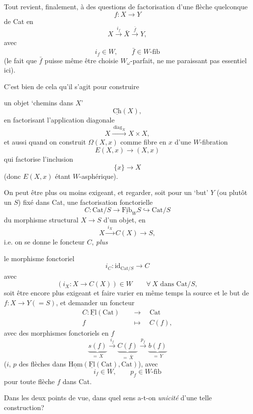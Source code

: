\documentclass[11pt]{article}
\newcommand{\printedpage}[1]{\marginpar{\footnotesize p.~#1}}
\newcommand{\msp}[1]{\marginpar{\footnotesize [#1]}}
\newcommand{\Ch}{\underline{\mathrm{Ch}}}
\newcommand{\Fib}{\underline{\mathrm{Fib}}}
\newcommand{\Fl}{\underline{\mathrm{Fl}}}
\newcommand{\Hom}{\underline{\mathrm{Hom}}}
\newcommand{\Cat}{\mathrm{Cat}}
\begin{document}
Tout revient, finalement, à des questions de factorisation d'une flèche quelconque
\[
f : X \longrightarrow Y
\]
\printedpage{127}
de Cat en
\[
X \xrightarrow{\ i_f\ } \bar{X} \xrightarrow{\ \bar{f}\ } Y,
\]
avec
\[
i_f \in W, \qquad \bar{f} \in W\text{-fib}
\]
(le fait que $\bar{f}$ puisse même être choisie $W_\omega$-parfait, ne me paraissant pas essentiel ici).

C'est bien de cela qu'il s'agit pour construire

\msp{page 192}
un objet `chemins dans $X$'
\[
\Ch(X),
\]
en factorisant l'application diagonale
\[
X \xrightarrow{\ \mathrm{diag}_X\ } X \times X,
\]
et aussi quand on construit $\Omega(X,x)$ comme fibre en $x$ d'une $W$-fibration
\[
E(X,x) \longrightarrow (X,x)
\]
qui factorise l'inclusion
\[
\{x\} \longrightarrow X
\]
(donc $E(X,x)$ étant $W$-asphérique).

On peut être plus ou moins exigeant, et regarder, soit pour un `but' $Y$ (ou plutôt un $S$) fixé dans Cat, une factorisation fonctorielle
\[
C : \Cat/S \longrightarrow \Fib_W S \hookrightarrow \Cat/S
\]
du morphisme structural $X \longrightarrow S$ d'un objet, en
\[
X \xrightarrow{\ i_X\ } C(X) \longrightarrow S,
\]
i.e. on se donne le foncteur $C$, \textit{plus}

\msp{page 193}
le morphisme fonctoriel
\[
i_C : \mathrm{id}_{\Cat/S} \longrightarrow C
\]
avec
\[
(i_X : X \longrightarrow C(X)) \in W \qquad \forall\ X \text{ dans } \Cat/S,
\]
soit être encore plus exigeant et faire varier en même temps la source et le but de $f : X \longrightarrow Y (= S)$, et demander un foncteur
\[
\begin{aligned}
C : \Fl(\Cat) \quad &\longrightarrow \quad \Cat \\
f \quad &\longmapsto \quad C(f),
\end{aligned}
\]
\printedpage{128}
avec des morphismes fonctoriels en $f$
\[
\underbrace{s(f)}_{=\,X} \xrightarrow{\ i_f\ } \underbrace{C(f)}_{=\,\bar{X}} \xrightarrow{\ p_f\ } \underbrace{b(f)}_{=\,Y}
\]
($i$, $p$ des flèches dans $\Hom(\Fl(\Cat),\Cat)$), avec
\[
i_f \in W, \qquad p_f \in W\text{-fib}
\]
pour toute flèche $f$ dans Cat.

\msp{page 194}
Dans les deux points de vue, dans quel sens a-t-on \textit{unicité} d'une telle construction?
\end{document}
